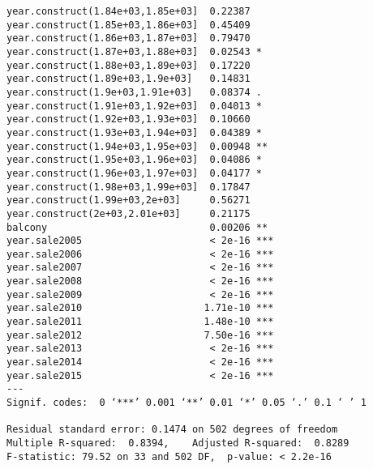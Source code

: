 \begin{lstlisting}
year.construct(1.84e+03,1.85e+03]  0.22387    
year.construct(1.85e+03,1.86e+03]  0.45409    
year.construct(1.86e+03,1.87e+03]  0.79470    
year.construct(1.87e+03,1.88e+03]  0.02543 *  
year.construct(1.88e+03,1.89e+03]  0.17220    
year.construct(1.89e+03,1.9e+03]   0.14831    
year.construct(1.9e+03,1.91e+03]   0.08374 .  
year.construct(1.91e+03,1.92e+03]  0.04013 *  
year.construct(1.92e+03,1.93e+03]  0.10660    
year.construct(1.93e+03,1.94e+03]  0.04389 *  
year.construct(1.94e+03,1.95e+03]  0.00948 ** 
year.construct(1.95e+03,1.96e+03]  0.04086 *  
year.construct(1.96e+03,1.97e+03]  0.04177 *  
year.construct(1.98e+03,1.99e+03]  0.17847    
year.construct(1.99e+03,2e+03]     0.56271    
year.construct(2e+03,2.01e+03]     0.21175    
balcony                            0.00206 ** 
year.sale2005                      < 2e-16 ***
year.sale2006                      < 2e-16 ***
year.sale2007                      < 2e-16 ***
year.sale2008                      < 2e-16 ***
year.sale2009                      < 2e-16 ***
year.sale2010                     1.71e-10 ***
year.sale2011                     1.48e-10 ***
year.sale2012                     7.50e-16 ***
year.sale2013                      < 2e-16 ***
year.sale2014                      < 2e-16 ***
year.sale2015                      < 2e-16 ***
---
Signif. codes:  0 ‘***’ 0.001 ‘**’ 0.01 ‘*’ 0.05 ‘.’ 0.1 ‘ ’ 1

Residual standard error: 0.1474 on 502 degrees of freedom
Multiple R-squared:  0.8394,	Adjusted R-squared:  0.8289 
F-statistic: 79.52 on 33 and 502 DF,  p-value: < 2.2e-16
\end{lstlisting}